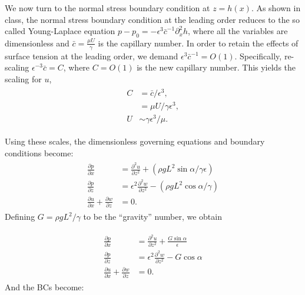 \documentclass{article}
\begin{document}
We now turn to the normal stress boundary condition at $z = h(x)$. As shown in class, the normal stress boundary condition at the leading order reduces to the so called Young-Laplace equation $p - p_{0} = -\epsilon^{3} \bar{c}^{-1} \partial^{2}_{x}h$, where all the variables are dimensionless and $\bar{c} = \frac{\mu U}{\gamma}$ is the capillary number. In order to retain the effects of surface tension at the leading order, we demand $\epsilon^{3} \bar{c}^{-1} = O(1)$. Specifically, re-scaling $\epsilon^{-3} \bar{c} = C$, where $C = O(1)$ is the new capillary number. This yields the scaling for $u$,
\begin{align}\label{eq:pendant_u_scale}
 \begin{split}
  C &= \bar{c}/\epsilon^{3},\\
  &= \mu U/\gamma \epsilon^{3},\\
  U &\sim \gamma \epsilon^{3}/\mu.
 \end{split}
\end{align}

Using these scales, the dimensionless governing equations and boundary conditions become: 
\begin{align}\label{eq:pendant_gov_eqns_dimless_0}
 \begin{split}
    \frac{\partial p}{\partial x} &= \frac{\partial^{2} u}{\partial z^{2}} + (\rho g  L^{2} \sin{\alpha}/ \gamma\epsilon)\\
  \frac{\partial p}{\partial z} &= \epsilon^{2} \frac{\partial^{2} w}{\partial z^{2}} - (\rho g L^{2} \cos{\alpha}/ \gamma) \\
  \frac{\partial u}{\partial x} + \frac{\partial w}{\partial z} &= 0.
 \end{split}
\end{align}
Defining $G = \rho g L^{2}/\gamma$ to be the ``gravity'' number, we obtain

\begin{align}\label{eq:pendant_gov_eqns_dimless}
 \begin{split}
 \frac{\partial p}{\partial x} &= \frac{\partial^{2} u}{\partial z^{2}} + \frac{G \sin{\alpha}}{\epsilon}\\
  \frac{\partial p}{\partial z} &= \epsilon^{2} \frac{\partial^{2} w}{\partial z^{2}} - G \cos{\alpha} \\
  \frac{\partial u}{\partial x} + \frac{\partial w}{\partial z} &= 0.
 \end{split}
\end{align}
And the BCs become:
\end{document}
